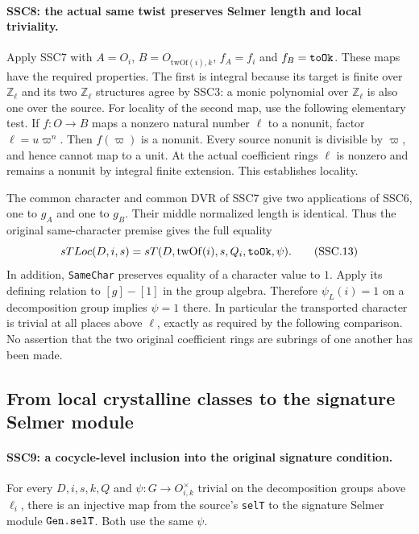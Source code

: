 \documentclass[11pt,a4paper]{article}
\numberwithin{equation}{section}
\theoremstyle{remark}\newtheorem{remark}[theorem]{Remark}
\begin{document}
\paragraph{SSC8: the actual same twist preserves Selmer length and local triviality.}
\label{claim:SSC8}
Apply SSC7 with $A=O_i$, $B=O_{\mathrm{twOf}(i),k}$,
$f_A=f_i$ and $f_B=\texttt{to\allowbreak Ok}$. These maps have the required
properties. The first is integral because its target is finite
over $\mathbb Z_\ell$ and its two $\mathbb Z_\ell$ structures
agree by SSC3: a monic polynomial over $\mathbb Z_\ell$ is also
one over the source. For locality of the second map, use the
following elementary test. If $f:O\to B$ maps a nonzero natural
number $\ell$ to a nonunit, factor $\ell=u\varpi^n$. Then
$f(\varpi)$ is a nonunit. Every source nonunit is divisible by
$\varpi$, and hence cannot map to a unit. At the actual coefficient
rings $\ell$ is nonzero and remains a nonunit by integral finite
extension. This establishes locality.

The common character and common DVR of SSC7 give two applications
of SSC6, one to $g_A$ and one to $g_B$. Their middle normalized
length is identical. Thus the original same-character premise
gives the full equality
\[
 sTLoc(D,i,s)
      =sT(D,\mathrm{twOf}(i),s,Q_i,\texttt{to\allowbreak Ok},\psi).        \tag{SSC.13}
\]
In addition, \texttt{Same\allowbreak Char} preserves equality of a character
value to $1$. Apply its defining relation to $[g]-[1]$ in the
group algebra. Therefore $\psi_L(i)=1$ on a decomposition group
implies $\psi=1$ there. In particular the transported character
is trivial at all places above $\ell$, exactly as required by the
following comparison. No assertion that the two original coefficient
rings are subrings of one another has been made.

\subsection{From local crystalline classes to the signature Selmer module}

\paragraph{SSC9: a cocycle-level inclusion into the original signature condition.}
\label{claim:SSC9}
For every $D,i,s,k,Q$ and $\psi:G\to O_{i,k}^\times$ trivial
on the decomposition groups above $\ell_i$, there is an injective
map from the source's \texttt{sel\allowbreak T} to the signature Selmer module
$\texttt{Gen.\allowbreak sel\allowbreak T}$. Both use the same $\psi$.
\end{document}
